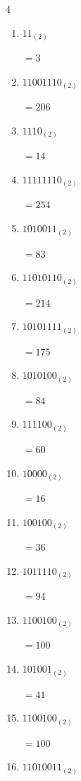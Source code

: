 \begin{multicols}{4}
\begin{enumerate}
        $=137$

  \item $11_{(2)}$

        $=3$

  \item $11001110_{(2)}$

        $=206$

  \item $1110_{(2)}$

        $=14$

  \item $11111110_{(2)}$

        $=254$

  \item $1010011_{(2)}$

        $=83$

  \item $11010110_{(2)}$

        $=214$

\columnbreak %

  \item $10101111_{(2)}$

        $=175$

  \item $1010100_{(2)}$

        $=84$

  \item $111100_{(2)}$

        $=60$

  \item $10000_{(2)}$

        $=16$

  \item $100100_{(2)}$

        $=36$

  \item $1011110_{(2)}$

        $=94$

  \item $1100100_{(2)}$

        $=100$

  \item $101001_{(2)}$

        $=41$

  \item $1100100_{(2)}$

        $=100$

  \item $11010011_{(2)}$


\end{enumerate}
\end{multicols}
